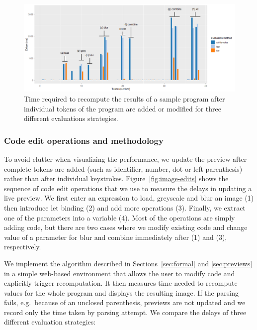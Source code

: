 \documentclass[acmsmall,anonymous,fleqn]{acmart}\settopmatter{printfolios=false,printccs=false,printacmref=false}
\theoremstyle{plain}
\theoremstyle{definition}
\newcommand{\ident}[1]{\textnormal{\textcolor{idclr}{\sffamily #1}}}
\begin{document}

\begin{figure}[b]
\vspace{-0.5em}
\includegraphics[scale=0.425]{drawing.png}
\caption{Time required to recompute the results of a sample program after individual tokens of
  the program are added or modified for three different evaluations strategies.}
\label{fig:drawing}
\vspace{-0.5em}
\end{figure}


\subsubsection{Code edit operations and methodology}

To avoid clutter when visualizing the performance, we update the preview after complete tokens are
added (such as identifier, number, dot or left parenthesis) rather than after individual keystrokes.
Figure~\ref{fig:image-edits} shows the sequence of code edit operations that we use to measure
the delays in updating a live preview. We first enter an expression to load, greyscale and blur
an image (1) then introduce let binding (2) and add more operations (3). Finally, we extract
one of the parameters into a variable (4). Most of the operations are simply adding code, but
there are two cases where we modify existing code and change value of a parameter for \ident{blur}
and \ident{combine} immediately after (1) and (3), respectively.

We implement the algorithm described in Sections~\ref{sec:formal} and \ref{sec:previews} in a
simple web-based environment that allows the user to modify code and explicitly trigger
recomputation. It then measures time needed to recompute values for the whole program and
displays the resulting image. If the parsing fails, e.g.~because of an unclosed parenthesis,
previews are not updated and we record only the time taken by parsing attempt. We compare the
delays of three different evaluation strategies:
\end{document}
